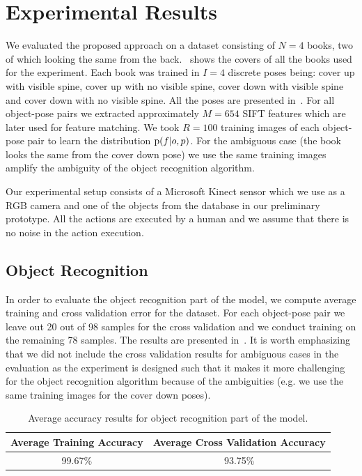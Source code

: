 \section{Experimental Results}



    We evaluated the proposed approach on a dataset consisting of $N = 4$ books, two of which looking the same from the back.~ shows the covers of all the books used for the experiment. Each book was trained in $I = 4$ discrete poses being: cover up with visible spine, cover up with no visible spine, cover down with visible spine and cover down with no visible spine. All the poses are presented in~. For all object-pose pairs we extracted approximately $M = 654$ SIFT features which are later used for feature matching. We took $R = 100$ training images of each object-pose pair to learn the distribution $\text{p}(f|o,p)$. For the ambiguous case (the book looks the same from the cover down pose) we use the same training images amplify the ambiguity of the object recognition algorithm.

    Our experimental setup consists of a Microsoft Kinect sensor which we use as a RGB camera and one of the objects from the database in our preliminary prototype. All the actions are executed by a human and we assume that there is no noise in the action execution. 

    \subsection{Object Recognition}
        In order to evaluate the object recognition part of the model, we compute average training and cross validation error for the dataset. For each object-pose pair we leave out 20 out of 98 samples for the cross validation and we conduct training on the remaining 78 samples. The results are presented in~. It is worth emphasizing that we did not include the cross validation results for ambiguous cases in the evaluation as the experiment is designed such that it makes it more challenging for the object recognition algorithm because of the ambiguities (e.g. we use the same training images for the cover down poses).  
        
        \begin{table}[h]
                \centering
                \begin{tabular}{|c|c|}
                \hline
                Average Training Accuracy & Average Cross Validation Accuracy \\
                \hline
                99.67\% & 93.75\% \\
                \hline
                \end{tabular}
                \caption{Average accuracy results for object recognition part of the model.}
                \label{tab:accuracy}
		\end{table}

